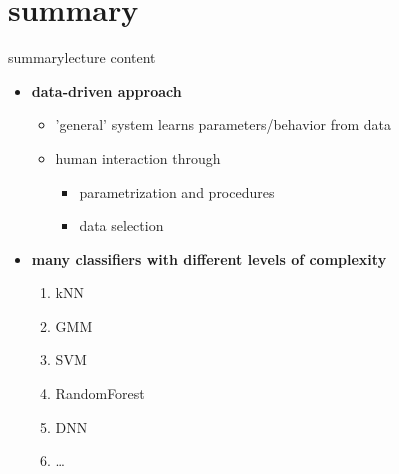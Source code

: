     \section{summary}
        \begin{frame}{summary}{lecture content}
            \begin{itemize}
                \item   \textbf{data-driven approach}
                    \begin{itemize}
                        \item   'general' system learns parameters/behavior from data
                        \item   human interaction through
                            \begin{itemize}
                                \item   parametrization and procedures
                                \item   data selection
                            \end{itemize}
                    \end{itemize}
                \bigskip
                \item   \textbf{many classifiers with different levels of complexity}
                    \begin{enumerate}
                        \item   kNN
                        \item   GMM
                        \item   SVM
                        \item   RandomForest
                        \item   DNN
                        \item   \ldots
                    \end{enumerate}
            \end{itemize}
        \end{frame}

